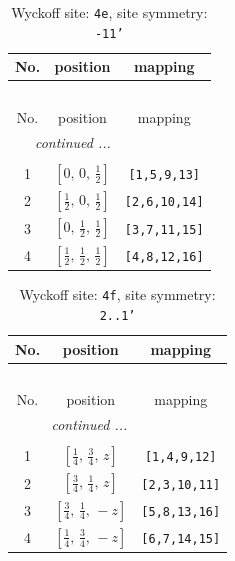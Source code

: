 \documentclass[fleqn,8pt]{jsarticle}
\begin{document}
\begin{longtable}{ccc}
\caption{Wyckoff site: {\tt 4e}, site symmetry: {\tt -11'}}
 \\
 \hline \hline
No. & position & mapping \\ \hline \endfirsthead

\multicolumn{2}{l}{\tablename\ \thetable{}} \\
 \hline \hline
No. & position & mapping \\ \hline \endhead

 \hline \hline
\multicolumn{2}{r}{\footnotesize\it continued ...} \\ \endfoot

 \hline \hline
\multicolumn{2}{r}{} \\ \endlastfoot

1 & $\left[ 0,\, 0,\, \frac{1}{2} \right]$ & {\tt [1,5,9,13]} \\ \hline
2 & $\left[ \frac{1}{2},\, 0,\, \frac{1}{2} \right]$ & {\tt [2,6,10,14]} \\ \hline
3 & $\left[ 0,\, \frac{1}{2},\, \frac{1}{2} \right]$ & {\tt [3,7,11,15]} \\ \hline
4 & $\left[ \frac{1}{2},\, \frac{1}{2},\, \frac{1}{2} \right]$ & {\tt [4,8,12,16]} \\
\end{longtable}
\renewcommand{\arraystretch}{1.2}
\begin{longtable}{ccc}
\caption{Wyckoff site: {\tt 4f}, site symmetry: {\tt 2..1'}}
 \\
 \hline \hline
No. & position & mapping \\ \hline \endfirsthead

\multicolumn{2}{l}{\tablename\ \thetable{}} \\
 \hline \hline
No. & position & mapping \\ \hline \endhead

 \hline \hline
\multicolumn{2}{r}{\footnotesize\it continued ...} \\ \endfoot

 \hline \hline
\multicolumn{2}{r}{} \\ \endlastfoot

1 & $\left[ \frac{1}{4},\, \frac{3}{4},\, z \right]$ & {\tt [1,4,9,12]} \\ \hline
2 & $\left[ \frac{3}{4},\, \frac{1}{4},\, z \right]$ & {\tt [2,3,10,11]} \\ \hline
3 & $\left[ \frac{3}{4},\, \frac{1}{4},\, - z \right]$ & {\tt [5,8,13,16]} \\ \hline
4 & $\left[ \frac{1}{4},\, \frac{3}{4},\, - z \right]$ & {\tt [6,7,14,15]} \\
\end{longtable}
\end{document}
